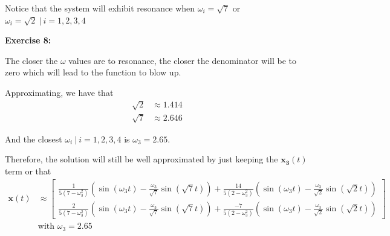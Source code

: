 \documentclass[12pt]{article}
\begin{document}
Notice that the system will exhibit resonance when $\omega_i = \sqrt{7}$ or $ \omega_i = \sqrt{2} ~|~ i = 1,2,3,4$

\noindent{}\textbf{Exercise 8:}

The closer the $\omega{}$ values are to resonance, the closer the denominator will be to zero which will lead to the function to blow up.

Approximating, we have that
\begin{align*}
    \sqrt{2} & \approx{1.414} \\
    \sqrt{7} & \approx{2.646}
\end{align*}

And the closest $\omega_i ~|~ i = 1,2,3,4$ is $\omega_3 = 2.65$.

Therefore, the solution will still be well approximated by just keeping the $\mathbf{x_3}(t)$ term or that
\begin{align*}
    \mathbf{x}(t) & \approx \begin{bmatrix}
                                \frac{1}{5(7-\omega_3^2)}(\sin(\omega_{3}t) - \frac{\omega_3}{\sqrt{7}}\sin(\sqrt{7}t)) + \frac{14}{5(2-\omega_3^2)}(\sin(\omega_{3}t) - \frac{\omega_3}{\sqrt{2}}\sin(\sqrt{2}t)) \\
                                \frac{2}{5(7-\omega_3^2)}(\sin(\omega_{3}t) - \frac{\omega_3}{\sqrt{7}}\sin(\sqrt{7}t)) + \frac{-7}{5(2-\omega_3^2)}(\sin(\omega_{3}t) - \frac{\omega_3}{\sqrt{2}}\sin(\sqrt{2}t))
                            \end{bmatrix} \\
                  & \text{with } \omega_3 = 2.65
\end{align*}
\end{document}

